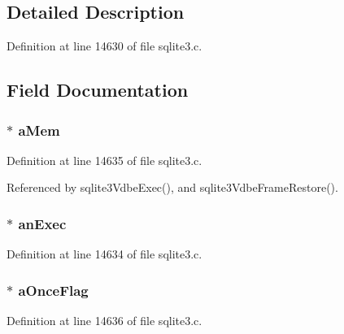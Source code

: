 \subsection{Detailed Description}


Definition at line 14630 of file sqlite3.\+c.



\subsection{Field Documentation}
\hypertarget{struct_vdbe_frame_adfd56f8b1cc1790601ff0940d884c200}{}
\subsubsection[{a\+Mem}]{$\ast$ a\+Mem}\label{struct_vdbe_frame_adfd56f8b1cc1790601ff0940d884c200}


Definition at line 14635 of file sqlite3.\+c.



Referenced by sqlite3\+Vdbe\+Exec(), and sqlite3\+Vdbe\+Frame\+Restore().

\hypertarget{struct_vdbe_frame_aed4f7f86306b16502f77aebf2d09a5ff}{}
\subsubsection[{an\+Exec}]{$\ast$ an\+Exec}\label{struct_vdbe_frame_aed4f7f86306b16502f77aebf2d09a5ff}


Definition at line 14634 of file sqlite3.\+c.

\hypertarget{struct_vdbe_frame_ae7256911c06e37eb7d9e0ab9bb9df93e}{}
\subsubsection[{a\+Once\+Flag}]{$\ast$ a\+Once\+Flag}\label{struct_vdbe_frame_ae7256911c06e37eb7d9e0ab9bb9df93e}


Definition at line 14636 of file sqlite3.\+c.



